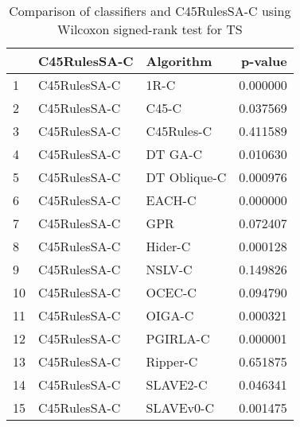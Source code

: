 \begin{table}
\footnotesize
\caption{Comparison of classifiers and C45RulesSA-C using Wilcoxon signed-rank test for TS}
\label{tab:C45RulesSA-C wilcoxon TS comparison}
\begin{tabular}{lllr}
\hline
 & C45RulesSA-C & Algorithm & p-value \\
\hline
1 & C45RulesSA-C & 1R-C & 0.000000 \\
2 & C45RulesSA-C & C45-C & 0.037569 \\
3 & C45RulesSA-C & C45Rules-C & 0.411589 \\
4 & C45RulesSA-C & DT GA-C & 0.010630 \\
5 & C45RulesSA-C & DT Oblique-C & 0.000976 \\
6 & C45RulesSA-C & EACH-C & 0.000000 \\
7 & C45RulesSA-C & GPR & 0.072407 \\
8 & C45RulesSA-C & Hider-C & 0.000128 \\
9 & C45RulesSA-C & NSLV-C & 0.149826 \\
10 & C45RulesSA-C & OCEC-C & 0.094790 \\
11 & C45RulesSA-C & OIGA-C & 0.000321 \\
12 & C45RulesSA-C & PGIRLA-C & 0.000001 \\
13 & C45RulesSA-C & Ripper-C & 0.651875 \\
14 & C45RulesSA-C & SLAVE2-C & 0.046341 \\
15 & C45RulesSA-C & SLAVEv0-C & 0.001475 \\
\hline
\end{tabular}
\end{table}
